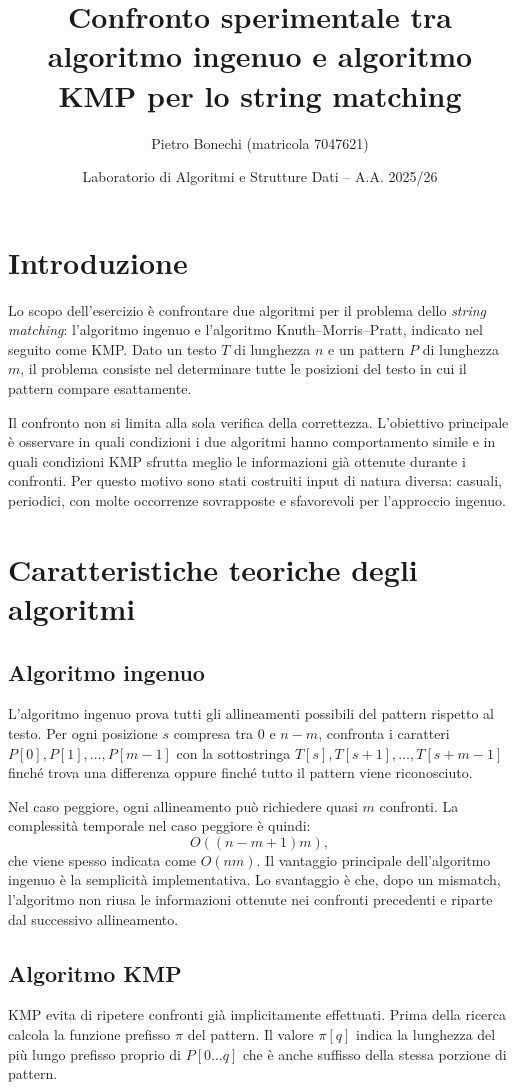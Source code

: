 \documentclass{article}
\title{Confronto sperimentale tra algoritmo ingenuo e algoritmo KMP per lo string matching}
\author{Pietro Bonechi (matricola 7047621)}
\date{Laboratorio di Algoritmi e Strutture Dati -- A.A. 2025/26}
\begin{document}
\maketitle
\tableofcontents
\newpage

\section{Introduzione}
Lo scopo dell'esercizio è confrontare due algoritmi per il problema dello \emph{string matching}: l'algoritmo ingenuo e l'algoritmo Knuth--Morris--Pratt, indicato nel seguito come KMP. Dato un testo $T$ di lunghezza $n$ e un pattern $P$ di lunghezza $m$, il problema consiste nel determinare tutte le posizioni del testo in cui il pattern compare esattamente.

Il confronto non si limita alla sola verifica della correttezza. L'obiettivo principale è osservare in quali condizioni i due algoritmi hanno comportamento simile e in quali condizioni KMP sfrutta meglio le informazioni già ottenute durante i confronti. Per questo motivo sono stati costruiti input di natura diversa: casuali, periodici, con molte occorrenze sovrapposte e sfavorevoli per l'approccio ingenuo.

\section{Caratteristiche teoriche degli algoritmi}
\subsection{Algoritmo ingenuo}
L'algoritmo ingenuo prova tutti gli allineamenti possibili del pattern rispetto al testo. Per ogni posizione $s$ compresa tra $0$ e $n-m$, confronta i caratteri $P[0], P[1], \ldots, P[m-1]$ con la sottostringa $T[s], T[s+1], \ldots, T[s+m-1]$ finché trova una differenza oppure finché tutto il pattern viene riconosciuto.

Nel caso peggiore, ogni allineamento può richiedere quasi $m$ confronti. La complessità temporale nel caso peggiore è quindi:
\[
    O((n-m+1)m),
\]
che viene spesso indicata come $O(nm)$. Il vantaggio principale dell'algoritmo ingenuo è la semplicità implementativa. Lo svantaggio è che, dopo un mismatch, l'algoritmo non riusa le informazioni ottenute nei confronti precedenti e riparte dal successivo allineamento.

\subsection{Algoritmo KMP}
KMP evita di ripetere confronti già implicitamente effettuati. Prima della ricerca calcola la funzione prefisso $\pi$ del pattern. Il valore $\pi[q]$ indica la lunghezza del più lungo prefisso proprio di $P[0 \ldots q]$ che è anche suffisso della stessa porzione di pattern.
\end{document}
